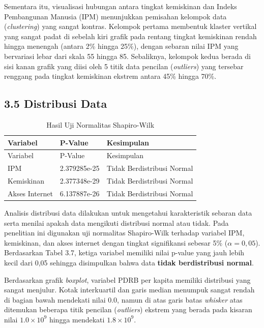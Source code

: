 \documentclass[
  12pt,
]{article}
\begin{document}
Sementara itu, visualisasi hubungan antara tingkat kemiskinan dan Indeks
Pembangunan Manusia (IPM) menunjukkan pemisahan kelompok data
(\textit{clustering}) yang sangat kontras. Kelompok pertama membentuk
klaster vertikal yang sangat padat di sebelah kiri grafik pada rentang
tingkat kemiskinan rendah hingga menengah (antara 2\% hingga 25\%),
dengan sebaran nilai IPM yang bervariasi lebar dari skala 55 hingga 85.
Sebaliknya, kelompok kedua berada di sisi kanan grafik yang diisi oleh 5
titik data pencilan (\textit{outliers}) yang tersebar renggang pada
tingkat kemiskinan ekstrem antara 45\% hingga 70\%.

\vspace{0.2cm}

\subsection{\texorpdfstring{\normalsize 3.5 \hspace {0,5cm} Distribusi
Data}{3.5  Distribusi Data}}\label{distribusi-data}

\vspace{-0.5cm}

\begin{longtable}[]{@{}lll@{}}
\caption{Hasil Uji Normalitas Shapiro-Wilk}\tabularnewline
\toprule\noalign{}
Variabel & P-Value & Kesimpulan \\
\midrule\noalign{}
\endfirsthead
\toprule\noalign{}
Variabel & P-Value & Kesimpulan \\
\midrule\noalign{}
\endhead
\bottomrule\noalign{}
\endlastfoot
IPM & 2.379285e-25 & Tidak Berdistribusi Normal \\
Kemiskinan & 2.377348e-29 & Tidak Berdistribusi Normal \\
Akses Internet & 6.137887e-26 & Tidak Berdistribusi Normal \\
\end{longtable}

Analisis distribusi data dilakukan untuk mengetahui karakteristik
sebaran data serta menilai apakah data mengikuti distribusi normal atau
tidak. Pada penelitian ini digunakan uji normalitas Shapiro-Wilk
terhadap variabel IPM, kemiskinan, dan akses internet dengan tingkat
signifikansi sebesar 5\% (\(\alpha = 0,05\)). Berdasarkan Tabel 3.7,
ketiga variabel memiliki nilai p-value yang jauh lebih kecil dari 0,05
sehingga disimpulkan bahwa data \textbf{tidak berdistribusi normal}.

Berdasarkan grafik \textit{boxplot}, variabel PDRB per kapita memiliki
distribusi yang sangat menjulur. Kotak interkuartil dan garis median
menumpuk sangat rendah di bagian bawah mendekati nilai \(0.0\), namun di
atas garis batas \textit{whisker} atas ditemukan beberapa titik pencilan
(\textit{outliers}) ekstrem yang berada pada kisaran nilai
\(1.0 \times 10^9\) hingga mendekati \(1.8 \times 10^9\).
\end{document}
